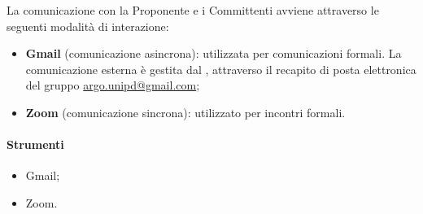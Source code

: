 \par La comunicazione con la Proponente e i Committenti avviene attraverso le seguenti modalità di interazione:
\begin{itemize}
  \item \textbf{Gmail} (comunicazione asincrona): utilizzata per comunicazioni formali. La comunicazione esterna è gestita dal \Responsabile{}, attraverso il recapito di posta elettronica del gruppo \href{mailto:argo.unipd@gmail.com}{argo.unipd\-@\-gmail.com};
  \item \textbf{Zoom} (comunicazione sincrona): utilizzato per incontri formali.
\end{itemize}

\paragraph*{Strumenti}
\IntroStrumenti
\begin{itemize}
  \item Gmail;
  \item Zoom.
\end{itemize}

